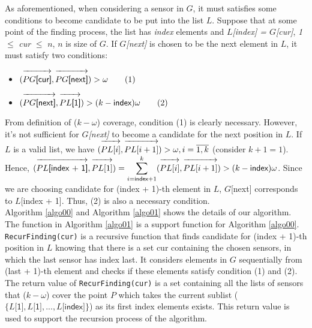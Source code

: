 As aforementioned, when considering a sensor in $G$, it must satisfies some conditions to become candidate to be put into the list $L$. Suppose that at some point of the finding process, the list has {\sf\itshape index} elements and {\sf\itshape $L$[index] = $G$[cur]}, {\sf\itshape 1} $\leq$ {\sf\itshape cur} $\leq$ {\sf\itshape $n$}, $n$ is size of $G$. If {\sf\itshape $G$[next]} is chosen to be the next element in $L$, it must satisfy two conditions:
\begin{itemize}
	\item $(\overrightarrow{\vphantom{\overrightarrow{P}}PG\textsf{[cur]}}, \overrightarrow{\vphantom{\overrightarrow{P}}PG\textsf{[next]}}) > \omega \qquad (1)$
	\item $(\overrightarrow{\vphantom{\overrightarrow{P}}PG\textsf{[next]}}, \overrightarrow{\vphantom{\overrightarrow{P}}PL\textsf{[1]}}) > (k-\textsf{index})\omega \qquad (2)$
\end{itemize}
From definition of ($k-\omega$) coverage, condition (1) is clearly necessary. However, it's not sufficient for {\sf\itshape $G$[next]} to become a candidate for the next position in $L$. If $L$ is a valid list, we have $(\overrightarrow{\vphantom{\overrightarrow{P}}PL[i]}, \overrightarrow{\vphantom{\overrightarrow{P}}PL[i+1]}) > \omega, i = \overline{1,k}$ (consider $k + 1 = 1$). Hence, $(\overrightarrow{\vphantom{\overrightarrow{P}}PL\textsf{[index + 1]}}, \overrightarrow{\vphantom{\overrightarrow{P}}PL[1]}) = \displaystyle\sum\limits_{i=\textsf{\scriptsize index} + 1}^{k}(\overrightarrow{\vphantom{\overrightarrow{P}}PL[i]}, \overrightarrow{\vphantom{\overrightarrow{P}}PL[i+1]}) > (k-\textsf{index})\omega$.
Since we are choosing candidate for {\sf (index + 1)-th} element in $L$, {\sf $G$[next]} corresponds to {\sf $L$[index + 1]}. Thus, (2) is also a necessary condition.\\[7pt]
Algorithm \ref{algo00} and Algorithm \ref{algo01} shows the details of our algorithm. The function in Algorithm \ref{algo01} is a support function for Algorithm \ref{algo00}. {\tt RecurFinding(cur)} is a recursive function that finds candidate for {\sf (index + 1)-th} position in $L$ knowing that there is a set {\sf cur} containing the chosen sensors, in which the last sensor has index {\sf last}. It considers elements in $G$ sequentially from {\sf (last + 1)-th} element and checks if these elements satisfy condition (1) and (2). The return value of {\tt RecurFinding(cur)} is a set containing all the lists of sensors that ($k-\omega$) cover the point $P$ which takes the current sublist ($\{L\textsf{[1]}, L\textsf{[1]},..., L\textsf{[index]}\}$) as its first {\sf index} elements exists. This return value is used to support the recursion process of the algorithm.

